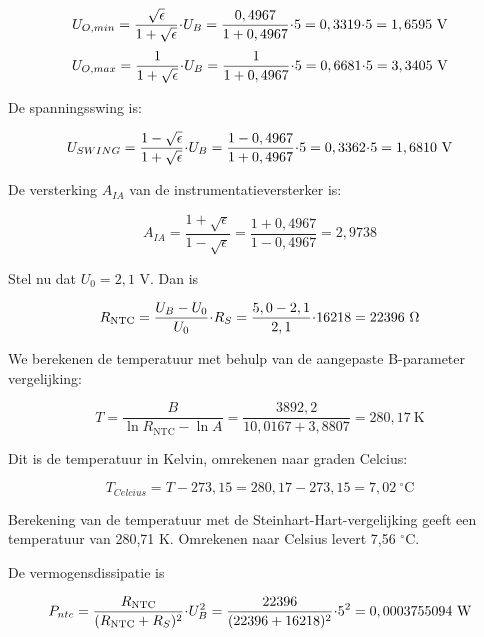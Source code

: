\documentclass[12pt,a4paper,final,twoside,fleqn]{article}
\newcommand{\rntc}{R_\text{NTC}}
\let\oldcdot\cdot
\renewcommand{\cdot}{\kern-.10em\oldcdot\kern-.10em}
\begin{document}
\begin{equation}
U_{O,min} = \dfrac{\sqrt{\epsilon}}{1+\sqrt{\epsilon}}\cdot U_B
          = \dfrac{0,4967}{1+0,4967}\cdot 5 = 0,3319\cdot 5
          = 1,6595\ \text{V}
\end{equation}
\begin{equation}
U_{O,max} = \dfrac{1}{1+\sqrt{\epsilon}}\cdot U_B
          = \dfrac{1}{1+0,4967}\cdot 5 = 0,6681\cdot 5
          = 3,3405\ \text{V}
\end{equation}

De spanningsswing is:

\begin{equation}
U_{SWING} = \dfrac{1-\sqrt{\epsilon}}{1+\sqrt{\epsilon}}\cdot U_B
          = \dfrac{1-0,4967}{1+0,4967}\cdot 5 = 0,3362\cdot 5
          = 1,6810\ \text{V}
\end{equation}

De versterking $A_{IA}$ van de instrumentatieversterker is:

\begin{equation}
A_{IA} = \dfrac{1+\sqrt{\epsilon}}{1-\sqrt{\epsilon}} = 
         \dfrac{1+0,4967}{1-0,4967} = 2,9738
\end{equation}

Stel nu dat $U_0 = 2,1$ V. Dan is

\begin{equation}
\rntc = \dfrac{U_B-U_0}{U_0}\cdot R_S = \dfrac{5,0-2,1}{2,1}\cdot 16218 = 22396\ \Omega
\end{equation}

We berekenen de temperatuur met behulp van de aangepaste B-parameter vergelijking:

\begin{equation}
T = \dfrac{B}{\ln \rntc - \ln A} = \dfrac{3892,2}{10,0167+3,8807} = 280,17\ \text{K}
\end{equation}

Dit is de temperatuur in Kelvin, omrekenen naar graden Celcius:

\begin{equation}
T_{Celcius} = T - 273,15 = 280,17 - 273,15 = 7,02\ ^\circ\text{C}
\end{equation}

Berekening van de temperatuur met de Steinhart-Hart-vergelijking geeft een temperatuur
van 280,71 K. Omrekenen naar Celsius levert 7,56 $^\circ\text{C}$.

De vermogensdissipatie is

\begin{equation}
P_{ntc} = \dfrac{\rntc}{(\rntc+R_S)^2}\cdot U_B^2 = \dfrac{22396}{(22396+16218)^2}\cdot 5^2
        = 0,0003755094\ \text{W}
\end{equation} 
\end{document}
